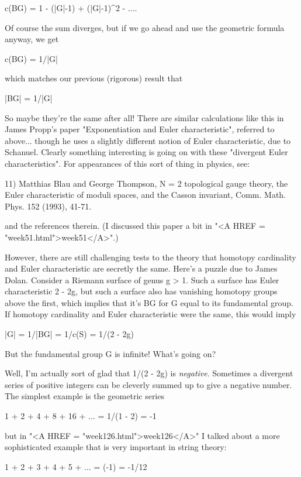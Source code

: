            c(BG) = 1  -  (|G|-1)  +  (|G|-1)^{2}  - ....

Of course the sum diverges, but if we go ahead and use the geometric
formula anyway, we get

                    c(BG) = 1/|G|

which matches our previous (rigorous) result that

                    |BG| = 1/|G|       

So maybe they're the same after all!   There are similar calculations like 
this in James Propp's paper "Exponentiation and Euler characteristic",
referred to above... though he uses a slightly different notion of Euler
characteristic, due to Schanuel.  Clearly something interesting is going
on with these "divergent Euler characteristics".  For appearances of this
sort of thing in physics, see:

11) Matthias Blau and George Thompson, N = 2 topological gauge 
theory, the Euler characteristic of moduli spaces, and the Casson 
invariant, Comm. Math. Phys. 152 (1993), 41-71. 

and the references therein.  (I discussed this paper a bit in "<A HREF = "week51.html">week51</A>".) 

However, there are still challenging tests to the theory that homotopy
cardinality and Euler characteristic are secretly the same.  Here's a
puzzle due to James Dolan.  Consider a Riemann surface of genus g > 1.
Such a surface has Euler characteristic 2 - 2g, but such a surface also
has vanishing homotopy groups above the first, which implies that it's
BG for G equal to its fundamental group.  If homotopy cardinality and
Euler characteristic were the same, this would imply

                 |G| = 1/|BG| = 1/c(S) = 1/(2 - 2g)

But the fundamental group G is infinite!  What's going on?  

Well, I'm actually sort of glad that 1/(2 - 2g) is \emph{negative}.   
Sometimes a divergent series of positive integers can be cleverly
summed up to give a negative number.  The simplest example is the
geometric series 

             1 + 2 + 4 + 8 + 16 + ... = 1/(1 - 2) = -1

but in "<A HREF = "week126.html">week126</A>" I talked about a more sophisticated example that
is very important in string theory:

             1 + 2 + 3 + 4 + 5 + ... = \zeta (-1) = -1/12

